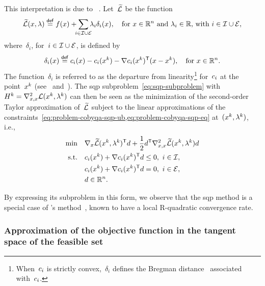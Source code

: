 This interpretation is due to \citeauthor{Robinson_1972a}~\cite[Rem.~4]{Robinson_1972a}.
Let~$\widetilde{\lag}$ be the function
\begin{equation*}
    \widetilde{\lag}(\iter, \lm) \eqdef \obj(\iter) + \sum_{\mathclap{i \in \iub \cup \ieq}} \lm_i \delta_i(\iter), \quad \text{for~$\iter \in \R^n$ and~$\lm_i \in \R$, with~$i \in \iub \cup \ieq$},
\end{equation*}
where~$\delta_i$, for~$i \in \mathcal{I} \cup \mathcal{E}$, is defined by
\begin{equation*}
    \delta_i(\iter) \eqdef \con{i}(\iter) - \con{i}(\iter[k]) - \nabla \con{i}(\iter[k])^{\T} (\iter - \iter[k]), \quad \text{for~$\iter \in \R^n$.}
\end{equation*}
The function~$\delta_i$ is referred to as the departure from linearity\footnote{When~$c_{i}$ is strictly convex,~$\delta_i$ defines the Bregman distance~\cite{Bregman_1967} associated with~$c_{i}$.} for~$c_{i}$ at the point~$\iter[k]$ (see~\cite[\S~2]{Gill_Wong_2011} and~\cite[\S~2.3]{Gill_Murray_Saunders_2005}).
The \gls{sqp} subproblem~\cref{eq:sqp-subproblem} with~$H^k = \nabla_{x, x}^2 \lag(\iter[k], \lm[k])$ can then be seen as the minimization of the second-order Taylor approximation of~$\widetilde{\lag}$ subject to the linear approximations of the constraints~\cref{eq:problem-cobyqa-sqp-ub,eq:problem-cobyqa-sqp-eq} at~$(\iter[k], \lm[k])$, i.e.,
\begin{align*}
    \min        & \quad \nabla_x \widetilde{\lag}(\iter[k], \lm[k])^{\T} \step + \frac{1}{2} \step^{\T} \nabla_{x, x}^2 \widetilde{\lag}(\iter[k], \lm[k]) \step\\
    \text{s.t.} & \quad \con{i}(\iter[k]) + \nabla \con{i}(\iter[k])^{\T} \step \le 0, ~ i \in \iub,\\
                & \quad \con{i}(\iter[k]) + \nabla \con{i}(\iter[k])^{\T} \step = 0, ~ i \in \ieq,\\
                & \quad \step \in \R^n.
\end{align*}

By expressing its subproblem in this form, we observe that the \gls{sqp} method is a special case of \citeauthor{Robinson_1972a}'s method~\cite{Robinson_1972a}, known to have a local R-quadratic convergence rate.

\subsubsection{Approximation of the objective function in the tangent space of the feasible set}

